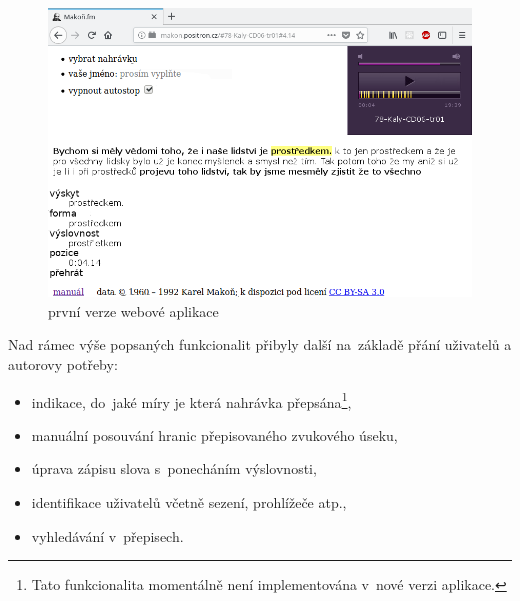 \begin{figure}[htpb]
\includegraphics[scale=0.8]{rc/makonfm-cs-1.png}
\caption{první verze webové aplikace}
\label{fig:prototyp}
\end{figure}



Nad rámec výše popsaných funkcionalit přibyly další na~základě přání uživatelů a
autorovy potřeby:

\begin{itemize}
\item{indikace, do~jaké míry je která nahrávka
přepsána\footnote{\label{fn:not-in-v2}Tato
funkcionalita momentálně není implementována v~nové verzi aplikace.},}
\item{manuální posouvání hranic přepisovaného zvukového
úseku,}
\item{úprava zápisu slova s~ponecháním výslovnosti,}
\item{identifikace uživatelů včetně sezení, prohlížeče atp.,}
\item{vyhledávání v~přepisech.}
\end{itemize}

